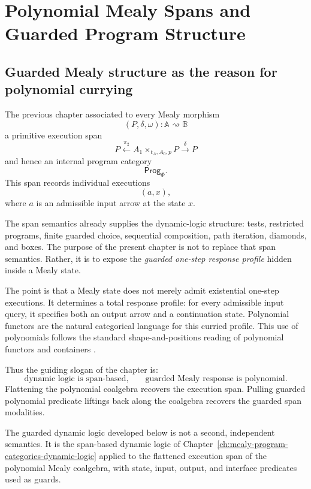 \chapter{Polynomial Mealy Spans and Guarded Program Structure}
\label{ch:polynomial-mealy-spans-guarded-programs}

\section{Guarded Mealy structure as the reason for polynomial currying}
\label{sec:guarded-mealy-structure-polynomial-currying}

The previous chapter associated to every Mealy morphism
\[
(P,\delta,\omega):\mathbb A\rightsquigarrow\mathbb B
\]
a primitive execution span
\[
P
\xleftarrow{\pi_2}
A_1\times_{t_A,A_0,p}P
\xrightarrow{\delta}
P
\]
and hence an internal program category
\[
\mathsf{Prog}_\Phi.
\]
This span records individual executions
\[
(a,x),
\]
where \(a\) is an admissible input arrow at the state \(x\).

The span semantics already supplies the dynamic-logic structure:
tests, restricted programs, finite guarded choice, sequential composition,
path iteration, diamonds, and boxes. The purpose of the present chapter is
not to replace that span semantics. Rather, it is to expose the
\emph{guarded one-step response profile} hidden inside a Mealy state.

The point is that a Mealy state does not merely admit existential
one-step executions. It determines a total response profile:
for every admissible input query, it specifies both an output arrow and a
continuation state. Polynomial functors are the natural categorical
language for this curried profile. This use of polynomials follows the
standard shape-and-positions reading of polynomial functors and containers
\cite{GambinoKockPolynomialFunctorsMonads,AbbottAltenkirchGhaniContainers}.

Thus the guiding slogan of the chapter is:
\[
\text{dynamic logic is span-based,}
\qquad
\text{guarded Mealy response is polynomial.}
\]
Flattening the polynomial coalgebra recovers the execution span. Pulling
guarded polynomial predicate liftings back along the coalgebra recovers
the guarded span modalities.

The guarded dynamic logic developed below is not a second, independent
semantics. It is the span-based dynamic logic of
Chapter~\ref{ch:mealy-program-categories-dynamic-logic} applied to the
flattened execution span of the polynomial Mealy coalgebra, with state,
input, output, and interface predicates used as guards.

